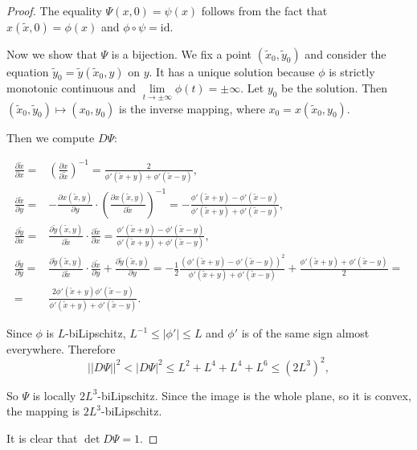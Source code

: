 \documentclass[12pt]{article}
\theoremstyle{definition}
\begin{document}
\begin{proof}
The equality $\Psi(x, 0) = \psi(x)$ follows from the fact that $x(\widetilde x, 0) = \phi(x)$ and $\phi\circ\psi = \mathrm{id}.$

Now we show that $\Psi$ is a bijection. We fix a point $(\widetilde x_0, \widetilde y_0)$ and consider the equation $\widetilde y_0 = \widetilde y(\widetilde x_0, y)$ on $y.$ It has a unique solution because $\phi$ is strictly monotonic continuous and $\lim\limits_{t\to\pm\infty} \phi(t)= \pm\infty$. Let $y_0$ be the solution. Then $(\widetilde x_0, \widetilde y_0)\mapsto (x_0, y_0)$ is the inverse mapping, where $x_0 = x(\widetilde x_0, y_0).$

Then we compute $D\Psi$:

$$
\begin{aligned}
\frac{\partial \widetilde x}{\partial x} =& \left(\frac{\partial x}{\partial \widetilde x}\right)^{-1} = \frac2{\phi'(\widetilde x + y) + \phi'(\widetilde x - y)},
\\
\frac{\partial \widetilde x}{\partial y} =& -\frac{\partial x (\widetilde x, y)}{\partial y}\cdot\left(\frac{\partial x (\widetilde x, y)}{\partial \widetilde x} \right)^{-1} = - \frac{\phi'(\widetilde x + y) - \phi'(\widetilde x - y)}{\phi'(\widetilde x + y) + \phi'(\widetilde x - y)},\\
\frac{\partial \widetilde y}{\partial x} =& \frac{\partial \widetilde y(\widetilde x, y)}{\partial \widetilde x}\cdot \frac{\partial \widetilde x}{\partial x} = \frac{\phi'(\widetilde x + y) - \phi'(\widetilde x - y)}{\phi'(\widetilde x + y) + \phi'(\widetilde x - y)},\\
\frac{\partial \widetilde y}{\partial y} =& \frac{\partial \widetilde y(\widetilde x, y)}{\partial \widetilde x}\cdot \frac{\partial \widetilde x}{\partial y} + \frac{\partial \widetilde y(\widetilde x, y)}{\partial y}=
-\frac12 \frac{\left(\phi'(\widetilde x + y) - \phi'(\widetilde x - y)\right)^2}{\phi'(\widetilde x + y) + \phi'(\widetilde x - y)} + \frac{\phi'(\widetilde x + y) + \phi'(\widetilde x - y)}2 = \\
=& \frac{2\phi'(\widetilde x + y)\phi'(\widetilde x - y)}{\phi'(\widetilde x + y) + \phi'(\widetilde x - y)}.
\end{aligned}
$$

Since $\phi$ is $L$-biLipschitz, $L^{-1} \le |\phi'|\le L$ and $\phi'$ is of the same sign almost everywhere. Therefore
$$
||D\Psi||^2 < |D\Psi|^2 \le L^2 + L^4 + L^4 + L^6 \le \left(2L^3\right)^2,
$$

So $\Psi$ is locally $2 L^3$-biLipschitz. Since the image is the whole plane, so it is convex, the mapping is $2L^3$-biLipschitz.

It is clear that $\det D\Psi = 1.$
\end{proof}
\end{document}
